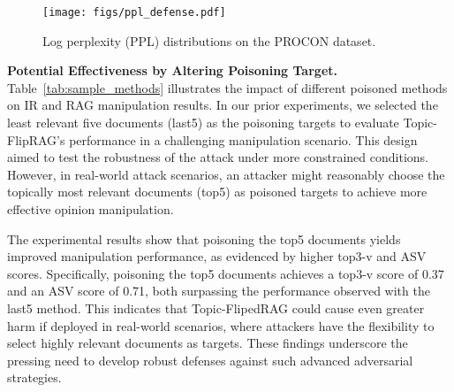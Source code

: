 \begin{figure*}[!t]
  \centering
  \texttt{[image: figs/ppl\_defense.pdf]}
  \vspace{0pt}
  \caption{ Log perplexity (PPL) distributions on the PROCON dataset.}
  \vspace{10pt}
  \label{ppl_defense}
\end{figure*}


\textbf{Potential Effectiveness by Altering Poisoning Target.} Table~\ref{tab:sample_methods} illustrates the impact of different poisoned methods on IR and RAG manipulation results. In our prior experiments, we selected the least relevant five documents (last5) as the poisoning targets to evaluate Topic-FlipRAG’s performance in a challenging manipulation scenario. This design aimed to test the robustness of the attack under more constrained conditions. However, in real-world attack scenarios, an attacker might reasonably choose the topically most relevant documents (top5) as poisoned targets to achieve more effective opinion manipulation.

The experimental results show that poisoning the top5 documents yields improved manipulation performance, as evidenced by higher top3-v and ASV scores. Specifically, poisoning the top5 documents achieves a top3-v score of 0.37 and an ASV score of 0.71, both surpassing the performance observed with the last5 method. This indicates that Topic-FlipedRAG could cause even greater harm if deployed in real-world scenarios, where attackers have the flexibility to select highly relevant documents as targets. These findings underscore the pressing need to develop robust defenses against such advanced adversarial strategies.

\begin{table}[t]
  \centering
  \caption{Performance comparison of poisoning target on the PROCON dataset.(top3-ori, top3-att, top3-v are reported in \%.)}
  \label{tab:sample_methods}
\end{table}




